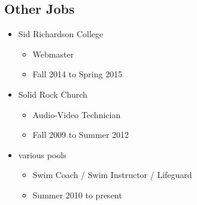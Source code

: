 \documentclass[a4paper]{article}
\begin{document}
\subsection{Other Jobs}

\begin{itemize}

    \item{Sid Richardson College}
    \begin{itemize}
        \item{Webmaster}
        \item{Fall 2014 to Spring 2015}
    \end{itemize}

    \item{Solid Rock Church}
    \begin{itemize}
        \item{Audio-Video Technician}
        \item{Fall 2009 to Summer 2012}
    \end{itemize}

    \item{various pools}
    \begin{itemize}
        \item{Swim Coach / Swim Instructor / Lifeguard}
        \item{Summer 2010 to present}
    \end{itemize}

\end{itemize}
\end{document}
